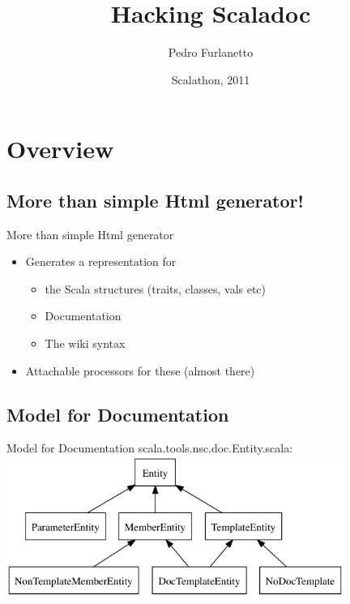 \documentclass{beamer}
\title{Hacking Scaladoc}
\author{Pedro Furlanetto}
\institute
{
\begin{minipage}{0.6\textwidth}
\begin{flushleft} 
\end{flushleft}
\end{minipage}
\begin{minipage}{0.3\textwidth}
\end{minipage}
  
}
\date[Scalathon 2011] %
{Scalathon, 2011}
\begin{document}


\section{Overview}

\subsection{More than simple Html generator!}

\begin{frame}{More than simple Html generator}
	\begin{itemize} %
	\item Generates a representation for
		\begin{itemize}  
		\item the Scala structures (traits, classes, vals etc)
		\item Documentation
		\item The wiki syntax
		\end{itemize}
	\item Attachable processors for these (almost there)
	\end{itemize}
\end{frame}

\subsection{Model for Documentation}
\begin{frame}{Model for Documentation} 
	scala.tools.nsc.doc.Entity.scala:
	\includegraphics[width=11cm]{../docs/ScaladocModelDoc.png} %
\end{frame}
\end{document}
